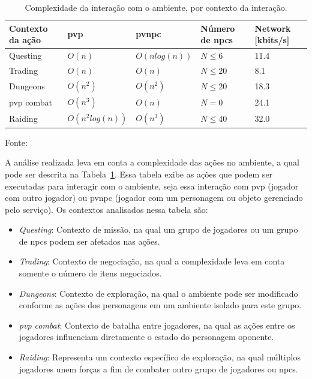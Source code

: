 \begin{table}[htb!]
\centering
\caption{Complexidade da interação com o ambiente, por contexto da interação.}
\label{tab:complexidade}
\begin{tabular}{|l|l|l|l|l|}
\hline
Contexto da ação        & \ac{pvp}           & \ac{pvnpc}              & Número de \acp{npc}    & Network {[}kbits/s{]} \\ \hline
Questing                & $O(n)$             & $O(n log(n))$           & $N \leq 6 $            & 11.4          \\ \hline
Trading                 & $O(n)$             & $O(n)$                  & $N \leq 20$            & 8.1           \\ \hline
Dungeons                & $O(n^2)$           & $O(n^2)$                & $N \leq 20$            & 18.3          \\ \hline
\ac{pvp} combat         & $O(n^3)$           & $O(n)$                  & $N = 0    $            & 24.1          \\ \hline
Raiding                 & $O(n^2 log(n))$    & $O(n^3)$                & $N \leq 40$            & 32.0          \\ \hline
\end{tabular}

Fonte:~\cite{6374456}
\end{table}


A análise realizada leva em conta a complexidade das ações no ambiente, a qual pode ser descrita na Tabela~\ref{tab:complexidade}.
%
Essa tabela exibe as ações que podem ser executadas para interagir com o ambiente, seja essa interação com \ac{pvp} (jogador com outro jogador) ou \ac{pvnpc} (jogador com um personagem ou objeto gerenciado pelo serviço).
%
Os contextos analisados nessa tabela são:

\begin{itemize}
  \item \textit{Questing}: Contexto de missão, na qual um grupo de jogadores ou um grupo de \acp{npc} podem ser afetados nas ações.
  \item \textit{Trading}: Contexto de negociação, na qual a complexidade leva em conta somente o número de itens negociados.
  \item \textit{Dungeons}: Contexto de exploração, na qual o ambiente pode ser modificado conforme as ações dos personagens em um ambiente isolado para este grupo.
  \item \textit{\ac{pvp} combat}: Contexto de batalha entre jogadores, na qual as ações entre os jogadores influenciam diretamente o estado do personagem oponente.
  \item \textit{Raiding}: Representa um contexto específico de exploração, na qual múltiplos jogadores unem forças a fim de combater outro grupo de jogadores ou \acp{npc}.
\end{itemize}


